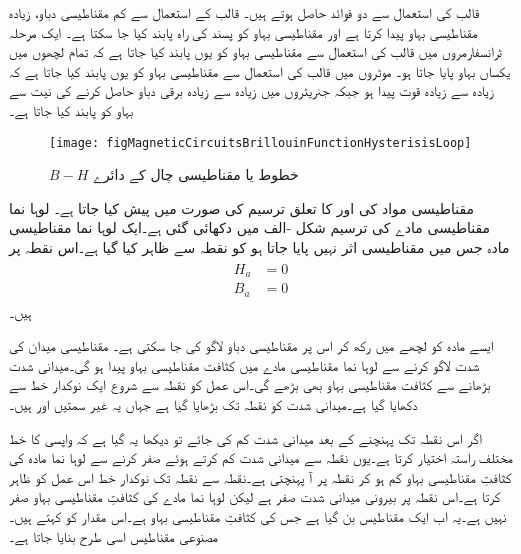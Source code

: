 قالب کی استعمال سے دو فوائد حاصل ہوتے ہیں۔ قالب کے استعمال سے کم مقناطیسی دباو، زیادہ مقناطیسی بہاو پیدا کرتا ہے اور مقناطیسی بہاو کو پسند کی راہ پابند کیا جا سکتا ہے۔ ایک مرحلہ ٹرانسفارمروں میں قالب کی استعمال سے مقناطیسی بہاو کو یوں پابند کیا جاتا ہے کہ تمام لچھوں میں یکساں بہاو پایا جاتا ہو۔ موٹروں میں قالب کی استعمال سے مقناطیسی بہاو کو یوں پابند کیا جاتا ہے کہ زیادہ سے زیادہ قوت پیدا ہو جبکہ جنریٹروں میں زیادہ سے زیادہ برقی دباو حاصل کرنے کی نیت سے بہاو کو پابند کیا جاتا ہے۔
\begin{figure}
\centering
\texttt{[image: figMagneticCircuitsBrillouinFunctionHysterisisLoop]}
\caption{$B-H$   خطوط یا مقناطیسی چال کے دائرے}
\label{شکل_مقناطیسی_چال}
\end{figure}
مقناطیسی مواد کی  اور  کا تعلق  ترسیم کی صورت میں پیش کیا جاتا ہے۔ لوہا نما مقناطیسی مادے کی   ترسیم شکل -الف میں دکھائی گئی ہے۔ایک لوہا نما مقناطیسی مادہ جس میں  مقناطیسی اثر نہیں پایا جاتا ہو کو نقطہ  سے ظاہر کیا گیا ہے۔اس نقطہ پر
\begin{gather}
\begin{aligned}
H_a&=0\\
B_a&=0
\end{aligned}
\end{gather}
ہیں۔

	ایسے مادہ کو لچھے میں رکھ کر اس پر مقناطیسی دباو لاگو کی جا سکتی ہے۔ مقناطیسی میدان کی شدت   لاگو کرنے سے لوہا نما مقناطیسی مادے میں کثافت مقناطیسی بہاو   پیدا ہو گی۔میدانی شدت بڑھانے سے کثافت مقناطیسی بہاو بھی بڑھے گی۔اس عمل کو نقطہ   سے شروع ایک نوکدار خط سے دکھایا گیا ہے۔میدانی شدت کو نقطہ   تک بڑھایا گیا ہے جہاں یہ غیر سمتیں   اور  ہیں۔

	اگر اس نقطہ تک پہنچنے کے بعد میدانی شدت کم کی جائے تو دیکھا یہ گیا ہے کہ واپسی کا خط مختلف راستہ اختیار کرتا ہے۔یوں نقطہ   سے میدانی شدت کم کرتے ہوئے صفر کرنے سے  لوہا نما مادہ کی کثافتِ مقناطیسی بہاو کم ہو کر نقطہ  پر آ پہنچتی ہے۔نقطہ  سے نقطہ  تک نوکدار خط اس عمل کو ظاہر کرتا ہے۔اس نقطہ پر بیرونی میدانی شدت صفر ہے لیکن لوہا نما مادے کی کثافتِ مقناطیسی بہاو صفر نہیں ہے۔یہ اب ایک مقناطیس بن گیا ہے جس کی کثافتِ مقناطیسی بہاو   ہے۔اس مقدار کو   کہتے ہیں۔مصنوعی مقناطیس اسی طرح بنایا جاتا ہے۔


